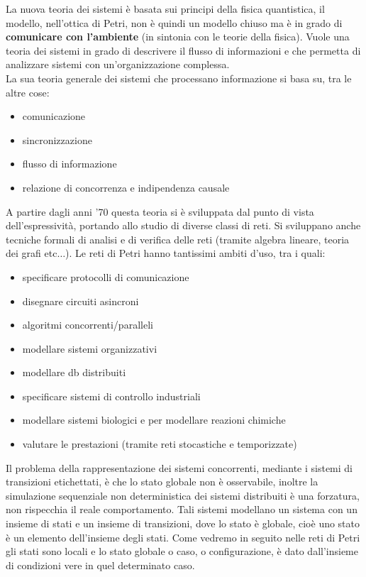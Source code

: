 La nuova teoria dei sistemi è basata sui principi della fisica quantistica, il
modello, nell’ottica di Petri, non è quindi un modello chiuso ma è 
in grado di \textbf{comunicare con l’ambiente} (in sintonia con le teorie della
fisica). Vuole una teoria dei sistemi in grado di descrivere il flusso di
informazioni e che permetta di analizzare sistemi con un'organizzazione
complessa.\\
La sua teoria generale dei sistemi che processano informazione si basa su, tra
le altre cose:
\begin{itemize}
  \item comunicazione
  \item sincronizzazione
  \item flusso di informazione
  \item relazione di concorrenza e indipendenza causale
\end{itemize}
A partire dagli anni '70 questa teoria si è sviluppata dal punto di vista
dell'espressività, portando allo studio di diverse classi di reti. Si sviluppano
anche tecniche formali di analisi e di verifica delle reti (tramite algebra
lineare, teoria dei grafi etc$\ldots$). Le reti di Petri hanno tantissimi ambiti
d'uso, tra i quali:
\begin{itemize}
  \item specificare protocolli di comunicazione
  \item disegnare circuiti asincroni
  \item algoritmi concorrenti/paralleli
  \item modellare sistemi organizzativi
  \item modellare db distribuiti
  \item specificare sistemi di controllo industriali
  \item modellare sistemi biologici e per modellare reazioni chimiche
  \item valutare le prestazioni (tramite reti stocastiche e temporizzate)
\end{itemize}
Il problema della rappresentazione dei sistemi concorrenti, mediante i sistemi di transizioni etichettati, è che lo stato globale non è
osservabile, inoltre la simulazione sequenziale non deterministica dei sistemi distribuiti è una
forzatura, non rispecchia il reale comportamento. Tali sistemi modellano un sistema con un insieme di stati e un insieme di transizioni, dove lo stato è globale, cioè uno stato è un elemento dell’insieme degli stati.
Come vedremo in seguito nelle reti di Petri gli stati sono locali e lo stato globale o caso, o configurazione, è dato dall’insieme di condizioni vere in quel determinato caso.
